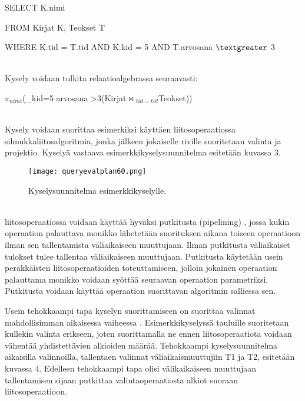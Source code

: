 \documentclass[finnish]{tktltiki2}
\theoremstyle{definition}
\theoremstyle{remark}
\begin{document}
\begin{frame}

SELECT K.nimi

FROM Kirjat K, Teokset T

WHERE K.tid = T.tid AND K.kid = 5 AND T.arvosana $\textgreater$  3
\end{frame}
\\\newline
Kysely voidaan tulkita relaatioalgebrassa seuraavasti:
\newline

\begin{frame}

$\pi$$_{nimi}$(\sigma_{kid=5 \wedge arvosana \textgreater 3}(Kirjat$\Join$$ _{tid=tid}$Teokset))
\end{frame}
\\\newline
Kysely voidaan suorittaa esimerkiksi käyttäen liitosoperaatiossa silmukkaliitosalgoritmia, jonka jälkeen jokaiselle riville suoritetaan 
valinta ja projektio. Kyselyä vastaava esimerkkikyselysuunnitelma esitetään kuvassa 3.

\begin{figure}[!h] 
  \centering
    \texttt{[image: queryevalplan60.png]}
  \caption{Kyselysuunnitelma esimerkkikyselylle.}
\end{figure}
\\\newline
liitosoperaatiossa voidaan käyttää hyväksi putkitusta (pipelining) \cite{dalvi2001pipelining}, jossa kukin operaation palauttava monikko lähetetään suorituksen aikana toiseen operaatioon ilman sen tallentamista väliaikaiseen muuttujaan. Ilman putkitusta väliaikaiset tulokset tulee tallentaa väliaikaiseen muuttujaan. Putkitusta käytetään usein peräkkäisten liitosoperaatioiden toteuttamiseen, jolloin jokainen operaation palauttama monikko voidaan syöttää seuraavan operaation parametriksi. Putkitusta voidaan käyttää operaation suorittavan algoritmin salliessa sen.

Usein tehokkaampi tapa kyselyn suorittamiseen on suorittaa valinnat mahdollisimman aikaisessa vaiheessa \cite{ramakrishnan2003database}. Esimerkkikyselyssä tauluille suoritetaan kullekin valinta erikseen, joten suorittamalla ne ennen liitosoperaatiota voidaan vähentää yhdistettävien alkioiden määrää. Tehokkaampi kyselysuunnitelma aikaisilla valinnoilla, tallentaen valinnat väliaikaismuuttujiin T1 ja T2, esitetään kuvassa 4. Edelleen tehokkaampi tapa olisi välikaikaiseen muuttujaan tallentamisen sijaan putkittaa valintaoperaatiosta alkiot suoraan liitosoperaatioon.
\end{document}
